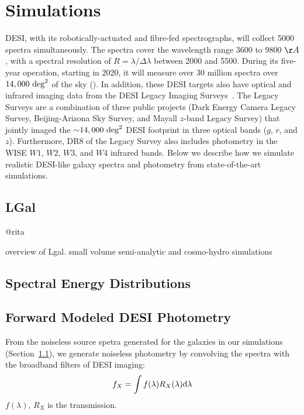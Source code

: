 \section{Simulations}\label{sec:sims}
DESI, with its robotically-actuated and fibre-fed spectrographs, will collect 5000 spectra simultaneously. The spectra
cover the wavelength range 3600 to 9800 $\AA$, with a spectral resolution of $R
= \lambda/\Delta \lambda$ between 2000 and 5500.
During its five-year operation, starting in 2020, it will measure over 30
million spectra over $14,000~{\rm deg}^2$ of the sky (). 
In addition, these DESI targets also have optical and infrared imaging data 
from the DESI Legacy Imaging Surveys~\citep[hereafter Legacy Surveys][]{dey2019}.
The Legacy Surveys are a combination of three public projects 
(Dark Energy Camera Legacy Survey, Beijing-Arizona Sky Survey, and Mayall 
$z$-band Legacy Survey) that jointly imaged the ${\sim}14,000~{\rm deg}^2$ DESI 
footprint in three optical bands ($g$, $r$, and $z$). Furthermore, DR8 of the
Legacy Survey also includes photometry in the WISE $W1$, $W2$, $W3$, and $W4$ 
infrared bands. 
Below we describe how we simulate realistic DESI-like galaxy spectra and photometry 
from state-of-the-art simulations.  

\subsection{LGal} \label{sec:lgal}
@rita

overview of Lgal. small volume semi-analytic and cosmo-hydro simulations


\subsection{Spectral Energy Distributions} \label{sec:sed}


\subsection{Forward Modeled DESI Photometry} \label{sec:photo} 
From the noiseless source spetra generated for the galaxies in our simulations 
(Section~\ref{sec:lgal}), we generate noiseless photometry by convolving the
spectra with the broadband filters of DESI imaging: 
\begin{equation}
     f_X = \int f(\lambda) R_X(\lambda) {\rm d}\lambda
\end{equation}
$f(\lambda)$, $R_X$ is the transmission. 

